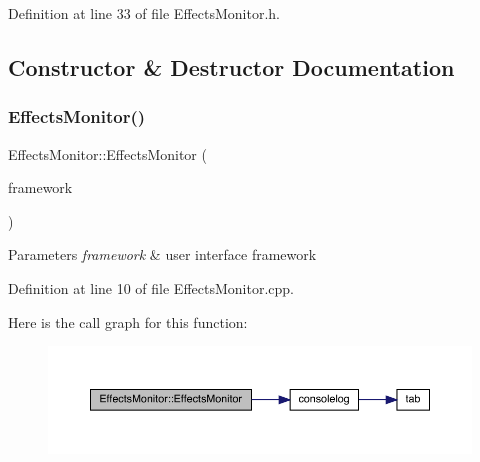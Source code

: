 Definition at line 33 of file Effects\+Monitor.\+h.



\subsection{Constructor \& Destructor Documentation}
\mbox{\label{class_effects_monitor_a484d2e47c270b1a9f608dd7c2c7e3994}} 
\subsubsection{\texorpdfstring{Effects\+Monitor()}{EffectsMonitor()}\hspace{0.1cm}{\footnotesize\ttfamily [1/2]}}
{\footnotesize\ttfamily Effects\+Monitor\+::\+Effects\+Monitor (\begin{DoxyParamCaption}\item[{Q\+Widget $\ast$}]{framework }\end{DoxyParamCaption})}


\begin{DoxyParams}{Parameters}
{\em framework} & user interface framework \\
\hline
\end{DoxyParams}


Definition at line 10 of file Effects\+Monitor.\+cpp.

Here is the call graph for this function\+:
\nopagebreak
\begin{figure}[H]
\begin{center}
\leavevmode
\includegraphics[width=350pt]{class_effects_monitor_a484d2e47c270b1a9f608dd7c2c7e3994_cgraph}
\end{center}
\end{figure}
\mbox{\label{class_effects_monitor_ad9215233b6d88585ec5d31ca4f35771a}} 
